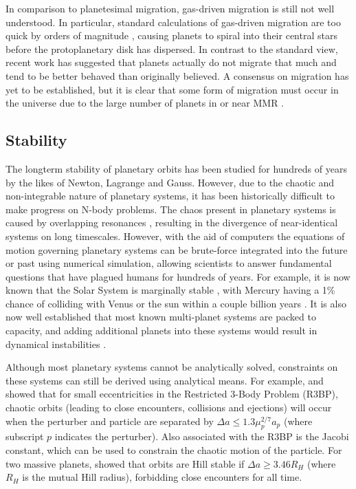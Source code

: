 \documentclass[12pt,letter]{aastex}
\begin{document}
In comparison to planetesimal migration, gas-driven migration is still not well understood. 
In particular, standard calculations of gas-driven migration are too quick by orders of magnitude \citep{Lin1986, Tanaka2002}, causing planets to spiral into their central stars before the protoplanetary disk has dispersed.
In contrast to the standard view, recent work \citep{Fung2017} has suggested that planets actually do not migrate that much and tend to be better behaved than originally believed. 
A consensus on migration has yet to be established, but it is clear that some form of migration must occur in the universe due to the large number of planets in or near MMR \citep{Lissauer2011,Fabrycky2014,Steffen2015}.

\subsection{Stability}
The longterm stability of planetary orbits has been studied for hundreds of years by the likes of Newton, Lagrange and Gauss. 
However, due to the chaotic and non-integrable nature of planetary systems, it has been historically difficult to make progress on N-body problems.  
The chaos present in planetary systems is caused by overlapping resonances \citep{Chirikov1979, Lecar2001}, resulting in the divergence of near-identical systems on long timescales. 
However, with the aid of computers the equations of motion governing planetary systems can be brute-force integrated into the future or past using numerical simulation, allowing scientists to answer fundamental questions that have plagued humans for hundreds of years. 
For example, it is now known that the Solar System is marginally stable \citep{Sussman1988, Laskar1994, Lecar2001}, with Mercury having a 1\% chance of colliding with Venus or the sun within a couple billion years \citep{Laskar2009}.
It is also now well established that most known multi-planet systems are packed to capacity, and adding additional planets into these systems would result in dynamical instabilities \citep{Fang2013,Pu2015}.

Although most planetary systems cannot be analytically solved, constraints on these systems can still be derived using analytical means.
For example, \citet{Wisdom1980} and \citet{Duncan1989} showed that for small eccentricities in the Restricted 3-Body Problem (R3BP), chaotic orbits (leading to close encounters, collisions and ejections) will occur when the perturber and particle are separated by $\Delta a \le 1.3\mu_p^{2/7}a_p$ (where subscript $p$ indicates the perturber). 
Also associated with the R3BP is the Jacobi constant, which can be used to constrain the chaotic motion of the particle. 
For two massive planets, \citet{Gladman1993} showed that orbits are Hill stable if $\Delta a \ge 3.46 R_H$ (where $R_H$ is the mutual Hill radius), forbidding close encounters for all time.
\end{document}
